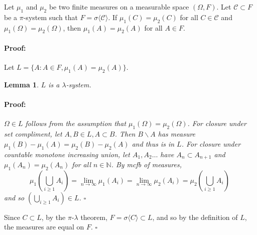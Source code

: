\documentclass{article}
\newenvironment{proof}{\paragraph{Proof:}}{\hfill$\square$}
\newtheorem{lemma}[theorem]{Lemma}
\newcommand{\N}{\mathbb{N}}
\begin{document}
Let $\mu_1$ and $\mu_2$ be two finite measures on a measurable space $(\Omega, F)$. Let $\mathcal{C} \subset F$ be a $\pi$-system such that $F = \sigma\langle \mathcal{C} \rangle$. If $\mu_1(C)=\mu_2(C)$ for all $C \in \mathcal{C}$ and $\mu_1(\Omega) = \mu_2(\Omega)$, then $\mu_1(A)=\mu_2(A)$ for all $A \in F$.

\begin{proof}
Let $L = \{ A:A\in F, \mu_1(A)=\mu_2(A) \}$.
\begin{lemma}
$L$ is a $\lambda$-system.
\begin{proof}
$\Omega \in L$ follows from the assumption that $\mu_1(\Omega)=\mu_2(\Omega)$.
For closure under set compliment, let $A, B \in L, A \subset B$. Then $B\backslash A$ has measure $\mu_1(B)-\mu_1(A) = \mu_2(B)-\mu_2(A)$ and thus is in $L$.
For closure under countable monotone increasing union, let $A_1, A_2 \dots$ have $A_n \subset A_{n+1}$ and $\mu_1(A_n)=\mu_2(A_n)$ for all $n \in \N$. By mcfb of measures,
\[
\mu_1\left(
\bigcup_{i \geq 1} A_i
\right) = \lim_{n \rightarrow \infty} \mu_1(A_i) = \lim_{n \rightarrow \infty} \mu_2(A_i) =
\mu_2\left(
\bigcup_{i \geq 1} A_i
\right)\
\]
and so $\left(\bigcup_{i \geq 1} A_i\right) \in L$.
\end{proof}
\end{lemma}
Since $C \subset L$, by the $\pi$-$\lambda$ theorem, $F = \sigma\langle C \rangle \subset L$, and so by the definition of $L$, the measures are equal on $F$.
\end{proof}
\end{document}
